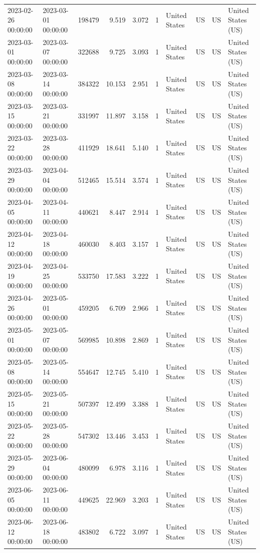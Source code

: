 \begin{tabular}{llrrrlllll}
2023-02-26 00:00:00 & 2023-03-01 00:00:00 & 198479 & 9.519 & 3.072 & 1 & United States & US & US & United States (US) \\
2023-03-01 00:00:00 & 2023-03-07 00:00:00 & 322688 & 9.725 & 3.093 & 1 & United States & US & US & United States (US) \\
2023-03-08 00:00:00 & 2023-03-14 00:00:00 & 384322 & 10.153 & 2.951 & 1 & United States & US & US & United States (US) \\
2023-03-15 00:00:00 & 2023-03-21 00:00:00 & 331997 & 11.897 & 3.158 & 1 & United States & US & US & United States (US) \\
2023-03-22 00:00:00 & 2023-03-28 00:00:00 & 411929 & 18.641 & 5.140 & 1 & United States & US & US & United States (US) \\
2023-03-29 00:00:00 & 2023-04-04 00:00:00 & 512465 & 15.514 & 3.574 & 1 & United States & US & US & United States (US) \\
2023-04-05 00:00:00 & 2023-04-11 00:00:00 & 440621 & 8.447 & 2.914 & 1 & United States & US & US & United States (US) \\
2023-04-12 00:00:00 & 2023-04-18 00:00:00 & 460030 & 8.403 & 3.157 & 1 & United States & US & US & United States (US) \\
2023-04-19 00:00:00 & 2023-04-25 00:00:00 & 533750 & 17.583 & 3.222 & 1 & United States & US & US & United States (US) \\
2023-04-26 00:00:00 & 2023-05-01 00:00:00 & 459205 & 6.709 & 2.966 & 1 & United States & US & US & United States (US) \\
2023-05-01 00:00:00 & 2023-05-07 00:00:00 & 569985 & 10.898 & 2.869 & 1 & United States & US & US & United States (US) \\
2023-05-08 00:00:00 & 2023-05-14 00:00:00 & 554647 & 12.745 & 5.410 & 1 & United States & US & US & United States (US) \\
2023-05-15 00:00:00 & 2023-05-21 00:00:00 & 507397 & 12.499 & 3.388 & 1 & United States & US & US & United States (US) \\
2023-05-22 00:00:00 & 2023-05-28 00:00:00 & 547302 & 13.446 & 3.453 & 1 & United States & US & US & United States (US) \\
2023-05-29 00:00:00 & 2023-06-04 00:00:00 & 480099 & 6.978 & 3.116 & 1 & United States & US & US & United States (US) \\
2023-06-05 00:00:00 & 2023-06-11 00:00:00 & 449625 & 22.969 & 3.203 & 1 & United States & US & US & United States (US) \\
2023-06-12 00:00:00 & 2023-06-18 00:00:00 & 483802 & 6.722 & 3.097 & 1 & United States & US & US & United States (US) \\

\end{tabular}
